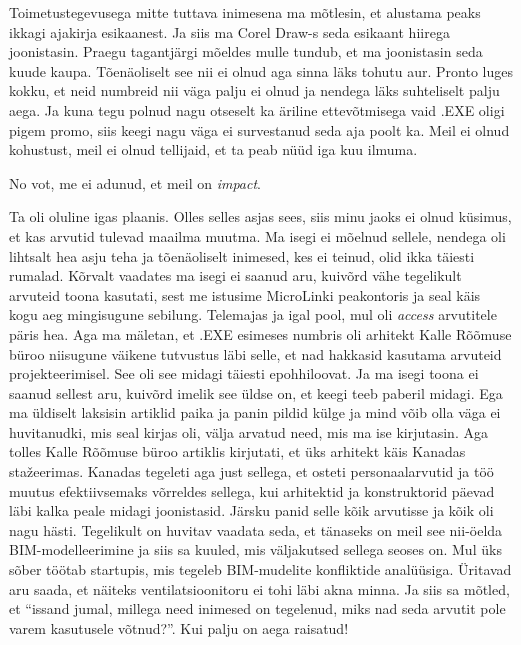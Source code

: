 Toimetustegevusega mitte tuttava inimesena ma mõtlesin, et  alustama peaks 
ikkagi ajakirja esikaanest. Ja siis ma Corel Draw-s seda esikaant  hiirega 
joonistasin. Praegu tagantjärgi mõeldes mulle tundub, et ma joonistasin seda 
kuude kaupa. Tõenäoliselt see nii ei olnud aga sinna läks tohutu aur. 
Pronto luges kokku, et neid numbreid nii väga palju ei olnud 
ja nendega läks suhteliselt palju aega. Ja kuna tegu polnud nagu otseselt ka 
äriline ettevõtmisega vaid .EXE oligi pigem promo, siis keegi nagu väga ei 
survestanud seda aja poolt ka. Meil ei olnud kohustust, meil ei olnud 
tellijaid, et ta peab nüüd iga kuu ilmuma.


No vot, me ei adunud, et meil on \emph{impact}.


Ta oli oluline igas plaanis. Olles selles asjas sees, siis minu jaoks ei olnud  
küsimus, et kas arvutid tulevad maailma muutma. Ma isegi ei mõelnud sellele, 
nendega oli lihtsalt hea asju teha ja  tõenäoliselt inimesed, kes ei teinud, 
olid ikka täiesti rumalad. Kõrvalt vaadates ma isegi ei saanud aru, kuivõrd 
vähe tegelikult arvuteid toona kasutati, sest me istusime MicroLinki 
peakontoris ja seal käis kogu aeg mingisugune sebilung. Telemajas ja igal pool, 
mul oli \emph{access} arvutitele päris hea. Aga ma mäletan, et .EXE  esimeses 
numbris  oli arhitekt Kalle Rõõmuse büroo niisugune 
väikene tutvustus  läbi selle, et nad hakkasid kasutama arvuteid 
projekteerimisel. See oli see midagi täiesti epohhiloovat. Ja ma isegi toona ei 
saanud sellest aru, kuivõrd imelik see  üldse on, et keegi teeb  paberil 
midagi. Ega  ma üldiselt  laksisin artiklid paika ja panin pildid külge ja mind 
võib olla väga ei huvitanudki, mis seal kirjas oli, välja arvatud need, mis ma 
ise kirjutasin. Aga tolles Kalle Rõõmuse büroo artiklis kirjutati, et üks 
arhitekt käis Kanadas stažeerimas. Kanadas tegeleti aga just sellega, et osteti 
personaalarvutid ja töö muutus efektiivsemaks võrreldes sellega, kui arhitektid 
ja konstruktorid päevad läbi kalka peale midagi joonistasid.  Järsku panid 
selle kõik arvutisse ja kõik oli nagu hästi. Tegelikult on huvitav vaadata 
seda, et tänaseks on meil see nii-öelda 
BIM-modelleerimine 
ja siis sa kuuled, mis väljakutsed sellega seoses on. Mul üks sõber töötab 
startupis, mis tegeleb BIM-mudelite konfliktide analüüsiga. Üritavad aru saada, 
et näiteks ventilatsioonitoru ei tohi läbi akna minna. Ja siis sa mõtled, et 
\enquote{issand jumal, millega need inimesed on tegelenud, miks nad seda 
arvutit pole varem kasutusele võtnud?}. Kui palju on aega raisatud!

